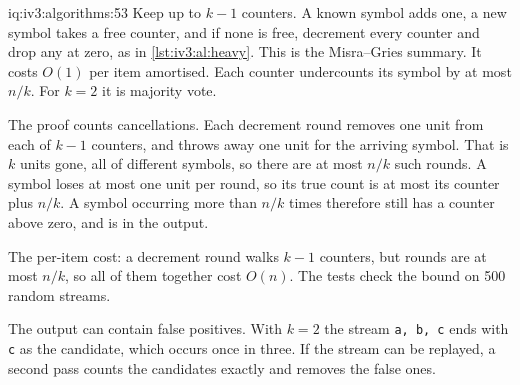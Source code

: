 \begin{solution}{iq:iv3:algorithms:53}
Keep up to $k - 1$ counters. A known symbol adds one, a new symbol takes a free counter, and if none is free, decrement every counter and drop any at zero, as in \cref{lst:iv3:al:heavy}. This is the Misra--Gries summary. It costs $O(1)$ per item amortised. Each counter undercounts its symbol by at most $n/k$. For $k = 2$ it is majority vote.
\label{lst:iv3:al:heavy}

The proof counts cancellations. Each decrement round removes one unit from each of $k - 1$ counters, and throws away one unit for the arriving symbol. That is $k$ units gone, all of different symbols, so there are at most $n / k$ such rounds. A symbol loses at most one unit per round, so its true count is at most its counter plus $n / k$. A symbol occurring more than $n/k$ times therefore still has a counter above zero, and is in the output.

The per-item cost: a decrement round walks $k - 1$ counters, but rounds are at most $n / k$, so all of them together cost $O(n)$. The tests check the bound on 500 random streams.

The output can contain false positives. With $k = 2$ the stream \texttt{a, b, c} ends with \texttt{c} as the candidate, which occurs once in three. If the stream can be replayed, a second pass counts the candidates exactly and removes the false ones.

\end{solution}

